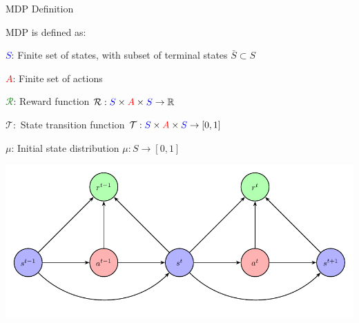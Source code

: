 \begin{frame}{MDP Definition}
  \bcol

     MDP is defined as: \\[5pt]
     
      \blist
      	\itemsep=10pt
        \item \textcolor{blue}{$S$}: Finite set of states, with subset of terminal states $\bar{S} \subset S$
        \item \textcolor{red}{$A$}: Finite set of actions
        \item \textcolor{green}{$\mathcal{R}$}: Reward function $\mathcal{R}: \textcolor{blue}{S} \times \textcolor{red}{A} \times \textcolor{blue}{S} \to \mathbb{R}$
        \item $\mathcal{T}:$ State transition function $\mathcal{T}: \textcolor{blue}{S} \times \textcolor{red}{A} \times \textcolor{blue}{S} \to [0, 1]$
        \item $\mu$: Initial state distribution $\mu: S \to [0,1]$
      \elist

        \includegraphics[width=\linewidth]{images/1_mdp_diagram.pdf}

  \ecol
\end{frame}

